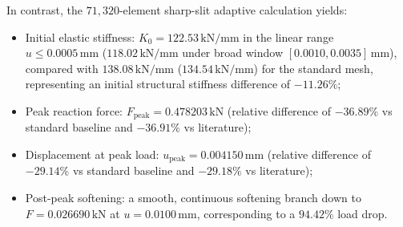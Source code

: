In contrast, the $71{,}320$-element sharp-slit adaptive calculation yields:
\begin{itemize}
  \item Initial elastic stiffness: $K_0 = 122.53\,\mathrm{kN/mm}$ in the linear range $u \le 0.0005\,\mathrm{mm}$ ($118.02\,\mathrm{kN/mm}$ under broad window $[0.0010, 0.0035]\,\mathrm{mm}$), compared with $138.08\,\mathrm{kN/mm}$ ($134.54\,\mathrm{kN/mm}$) for the standard mesh, representing an initial structural stiffness difference of $-11.26\%$;
  \item Peak reaction force: $F_{\text{peak}} = 0.478203\,\mathrm{kN}$ (relative difference of $-36.89\%$ vs standard baseline and $-36.91\%$ vs literature);
  \item Displacement at peak load: $u_{\text{peak}} = 0.004150\,\mathrm{mm}$ (relative difference of $-29.14\%$ vs standard baseline and $-29.18\%$ vs literature);
  \item Post-peak softening: a smooth, continuous softening branch down to $F = 0.026690\,\mathrm{kN}$ at $u = 0.0100\,\mathrm{mm}$, corresponding to a $94.42\%$ load drop.
\end{itemize}

